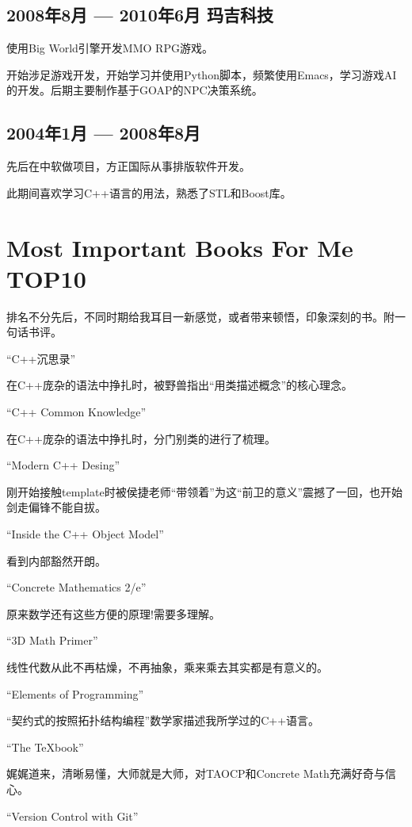 \documentclass{article}
\begin{document}
\begin{CJK*}{UTF8}{gbsn}
\subsection*{2008年8月 --- 2010年6月 \quad 玛吉科技}

使用Big World引擎开发MMO RPG游戏。

开始涉足游戏开发，开始学习并使用Python脚本，频繁使用Emacs，学习游戏AI的开发。后期主要制作基于GOAP的NPC决策系统。

\subsection*{2004年1月 --- 2008年8月}

先后在中软做项目，方正国际从事排版软件开发。

此期间喜欢学习C++语言的用法，熟悉了STL和Boost库。

\section*{Most Important Books For Me TOP10}

排名不分先后，不同时期给我耳目一新感觉，或者带来顿悟，印象深刻的书。附一句话书评。

``C++沉思录''

在C++庞杂的语法中挣扎时，被野兽指出``用类描述概念''的核心理念。

``C++ Common Knowledge''

在C++庞杂的语法中挣扎时，分门别类的进行了梳理。

``Modern C++ Desing''

刚开始接触template时被侯捷老师``带领着''为这``前卫的意义''震撼了一回，也开始剑走偏锋不能自拔。

``Inside the C++ Object Model''

看到内部豁然开朗。

``Concrete Mathematics 2/e''

原来数学还有这些方便的原理!需要多理解。

``3D Math Primer''

线性代数从此不再枯燥，不再抽象，乘来乘去其实都是有意义的。

``Elements of Programming''

``契约式的按照拓扑结构编程''数学家描述我所学过的C++语言。

``The \TeX book''

娓娓道来，清晰易懂，大师就是大师，对TAOCP和Concrete Math充满好奇与信心。

``Version Control with Git''


\end{CJK*}
\end{document}
